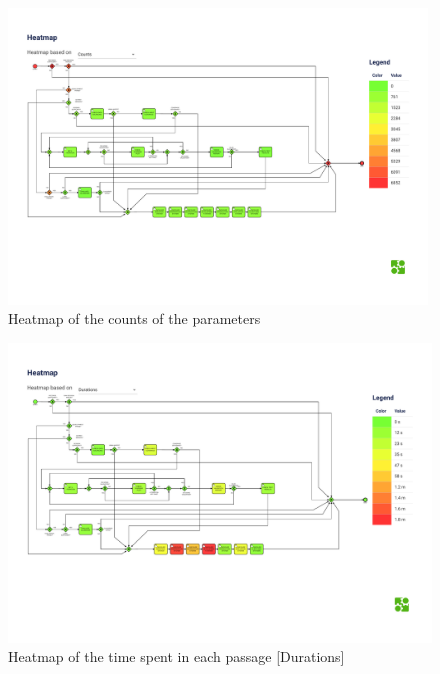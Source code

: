 \begin{figure}[H]
    \centering
    \includegraphics[width=0.99\textwidth]{figures/heatmap_counts.pdf}
    \caption{Heatmap of the counts of the parameters}
    \label{fig:heatmap_counts}
\end{figure}

\begin{figure}[H]
    \centering
    \includegraphics[width=1\textwidth]{figures/heatmap_durations.pdf}
    \caption{Heatmap of the time spent in each passage [Durations]}
    \label{fig:heatmap_durations}
\end{figure}

